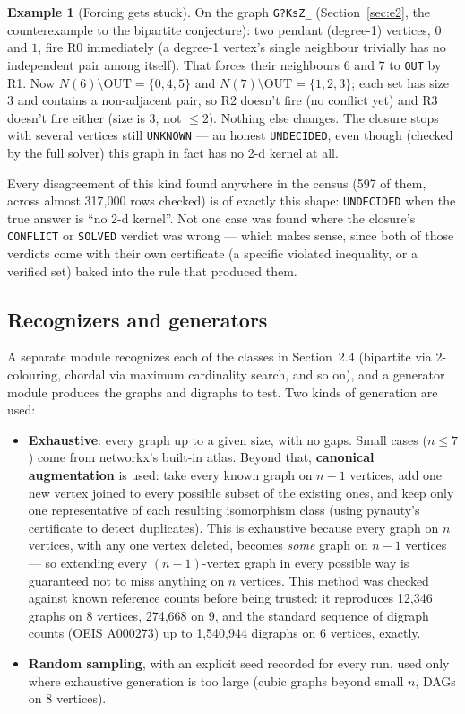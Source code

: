 \documentclass[11pt]{article}
\theoremstyle{plain}
\theoremstyle{definition}
\newtheorem{example}[theorem]{Example}
\theoremstyle{remark}
\begin{document}
\begin{example}[Forcing gets stuck]
\label{ex:stuck}
On the graph \texttt{G?KsZ\_} (Section~\ref{sec:e2}, the counterexample to the
bipartite conjecture): two pendant (degree-1) vertices, $0$ and $1$, fire R0
immediately (a degree-1 vertex's single neighbour trivially has no independent pair
among itself). That forces their neighbours $6$ and $7$ to \texttt{OUT} by R1. Now
$N(6)\setminus\text{OUT} = \{0,4,5\}$ and $N(7)\setminus\text{OUT} = \{1,2,3\}$; each
set has size 3 and contains a non-adjacent pair, so R2 doesn't fire (no conflict yet)
and R3 doesn't fire either (size is 3, not $\le 2$). Nothing else changes. The closure
stops with several vertices still \texttt{UNKNOWN} — an honest \texttt{UNDECIDED}, even
though (checked by the full solver) this graph in fact has no 2-d kernel at all.
\end{example}

Every disagreement of this kind found anywhere in the census (597 of them, across
almost 317{,}000 rows checked) is of exactly this shape: \texttt{UNDECIDED} when the
true answer is ``no 2-d kernel''. Not one case was found where the closure's
\texttt{CONFLICT} or \texttt{SOLVED} verdict was wrong — which makes sense, since both
of those verdicts come with their own certificate (a specific violated inequality, or
a verified set) baked into the rule that produced them.

\subsection{Recognizers and generators}

A separate module recognizes each of the classes in Section~2.4 (bipartite via
2-colouring, chordal via maximum cardinality search, and so on), and a generator
module produces the graphs and digraphs to test. Two kinds of generation are used:

\begin{itemize}[nosep]
\item \textbf{Exhaustive}: every graph up to a given size, with no gaps. Small cases
($n \le 7$) come from networkx's built-in atlas. Beyond that, \textbf{canonical
augmentation} is used: take every known graph on $n-1$ vertices, add one new vertex
joined to every possible subset of the existing ones, and keep only one representative
of each resulting isomorphism class (using pynauty's certificate to detect
duplicates). This is exhaustive because every graph on $n$ vertices, with any one
vertex deleted, becomes \emph{some} graph on $n-1$ vertices — so extending every
$(n-1)$-vertex graph in every possible way is guaranteed not to miss anything on $n$
vertices. This method was checked against known reference counts before being
trusted: it reproduces 12{,}346 graphs on 8 vertices, 274{,}668 on 9, and the standard
sequence of digraph counts (OEIS A000273) up to 1{,}540{,}944 digraphs on 6 vertices,
exactly.
\item \textbf{Random sampling}, with an explicit seed recorded for every run, used
only where exhaustive generation is too large (cubic graphs beyond small $n$, DAGs on
8 vertices).
\end{itemize}
\end{document}
